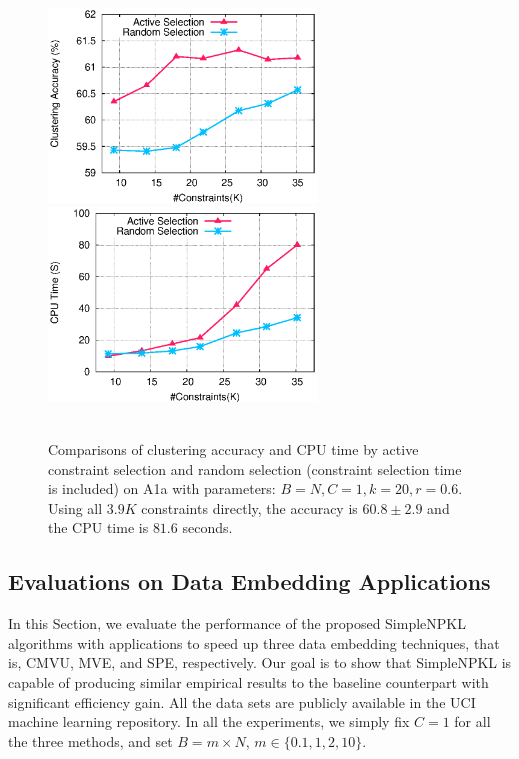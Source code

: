 \begin{figure}[htbp]
\begin{center}
\includegraphics[width=2.8in]{figures/cnst_acc.eps}
\includegraphics[width=2.8in]{figures/cnst_time.eps}
{\footnotesize{}~~~~~~~~~~~~~~~~~~~~~~~~~~~~~~~~~~~~~~~~} \vspace{-0.1in}
\caption{Comparisons of clustering accuracy and CPU time by active
constraint selection and random selection (constraint selection time
is included) on A1a with parameters: $B=N, C=1, k=20,r=0.6$. Using
all $3.9K$ constraints directly, the accuracy is $60.8\pm2.9$ and
the CPU time is $81.6$ seconds.} \label{fig:active-cnst-slctn}
\end{center}
\end{figure}

\subsection{Evaluations on Data Embedding Applications}

In this Section, we evaluate the performance of the proposed SimpleNPKL algorithms
with applications to speed up three data embedding techniques, that is, CMVU, MVE,
and SPE, respectively. Our goal is to show that SimpleNPKL is capable of producing
similar empirical results to the baseline counterpart with significant efficiency gain.
All the data sets are publicly available in the UCI machine learning repository. In all
the experiments, we simply fix $C=1$ for all the three methods, and set $B = m\times
N$, $m\in\{0.1, 1, 2, 10\}$.

